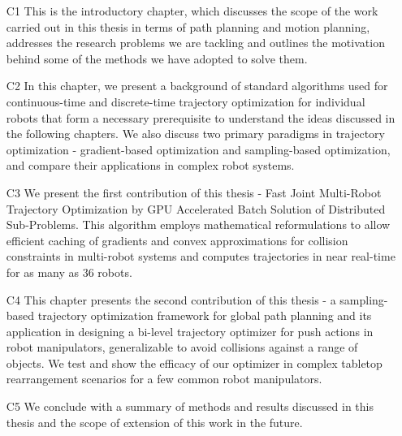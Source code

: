 \begin{itemize}
    \item[C1] This is the introductory chapter, which discusses the scope of the work carried out in this thesis in terms of path planning and motion planning, addresses the research problems we are tackling and outlines the motivation behind some of the methods we have adopted to solve them.
    \item[C2] In this chapter, we present a background of standard algorithms used for continuous-time and discrete-time trajectory optimization for individual robots that form a necessary prerequisite to understand the ideas discussed in the following chapters. We also discuss two primary paradigms in trajectory optimization - gradient-based optimization and sampling-based optimization, and compare their applications in complex robot systems.
    \item[C3] We present the first contribution of this thesis - Fast Joint Multi-Robot Trajectory Optimization by GPU Accelerated Batch Solution of Distributed Sub-Problems. This algorithm employs mathematical reformulations to allow efficient caching of gradients and convex approximations for collision constraints in multi-robot systems and computes trajectories in near real-time for as many as 36 robots.
    \item[C4] This chapter presents the second contribution of this thesis - a sampling-based trajectory optimization framework for global path planning and its application in designing a bi-level trajectory optimizer for push actions in robot manipulators, generalizable to avoid collisions against a range of objects. We test and show the efficacy of our optimizer in complex tabletop rearrangement scenarios for a few common robot manipulators.
    \item[C5] We conclude with a summary of methods and results discussed in this thesis and the scope of extension of this work in the future.
\end{itemize}
